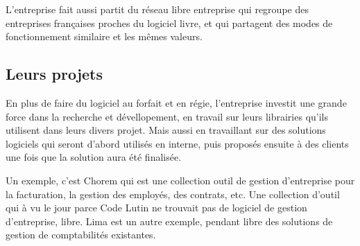 L'entreprise fait aussi partit du réseau libre entreprise qui regroupe des
entreprises françaises proches du logiciel livre, et qui partagent des modes de
fonctionnement similaire et les mêmes valeurs.



\subsection{Leurs projets}

En plus de faire du logiciel au forfait et en régie, l'entreprise investit une
grande force dans la recherche et dévellopement, en travail sur leurs librairies
qu'ils utilisent dans leurs divers projet. Mais aussi en travaillant sur des
solutions logiciels qui seront d'abord utilisés en interne, puis proposés
ensuite à des clients une fois que la solution aura été finalisée.

Un exemple, c'est Chorem qui est une collection outil de gestion d'entreprise
pour la facturation, la gestion des employés, des contrats, etc. Une collection
d'outil qui à vu le jour parce Code Lutin ne trouvait pas de logiciel de gestion
d'entreprise, libre. Lima est un autre exemple, pendant libre des solutions de
gestion de comptabilités existantes.
